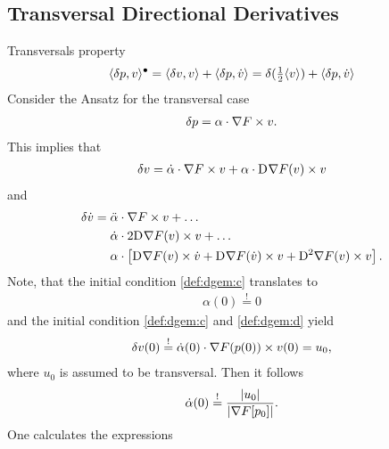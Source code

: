 \subsection{Transversal Directional Derivatives}


Transversals property
\begin{align}
    \langle  \delta p ,  v  \rangle^\bullet  =
    \langle  \delta v ,  v  \rangle  +  \langle  \delta p ,  \dot{ v }  \rangle  =
    \delta( \tfrac12 \langle  v  \rangle )  +  \langle  \delta p ,  \dot{ v }  \rangle
    \label{def:ta}
\end{align}
Consider the Ansatz for the transversal case
\begin{align}
    \delta p  =  \alpha \cdot \nabla F  \times v .
    \label{eq:tad}
\end{align}
This implies that
\begin{align}
    \delta v  =
    \dot{ \alpha } \cdot \nabla F  \times v  +
    \alpha \cdot \mathrm{D}^{  } \nabla F  ( v ) \times v
    \label{eq:tadd}
\end{align}
and
\begin{align}
    \delta \dot{ v }  &=
    \ddot{ \alpha } \mult \grad{ F } \times v  +  \dots\nonumber\\
    &\hphantom{{}={}}\dot{ \alpha } \mult 2 \diff{}{ \grad{ F } }( v ) \times v  +  \dots\nonumber\\
    &\hphantom{{}={}}\alpha \mult \left[ \diff{}{ \grad{ F } }( v ) \times \dot{ v }  +
    \diff{}{ \grad{ F } }( \dot{ v } ) \times v  +  
    \diff{ 2 }{ \grad{ F } }( v ) \times v \right] .
\end{align}
Note, that the initial condition \eqref{def:dgem:c} translates to
\begin{align}
    \alpha( 0 )  \overset{!}{=}  0
\end{align}
and the initial condition \eqref{def:dgem:c} and \eqref{def:dgem:d} yield
\begin{align}
    \delta v( 0 )   \overset{!}{=}
    \dot{ \alpha }( 0 ) \cdot \nabla F( p( 0 ) ) \times v( 0 )  =  u_0 ,
\end{align}
where $ u_0 $ is assumed to be transversal.
Then it follows 
\begin{align}
    \dot{ \alpha }( 0 )   \overset{!}{=}
    \frac{ \lvert  u_0  \rvert }{ \lvert  \nabla F[ p_0 ]  \rvert } .
\end{align}
One calculates the expressions
